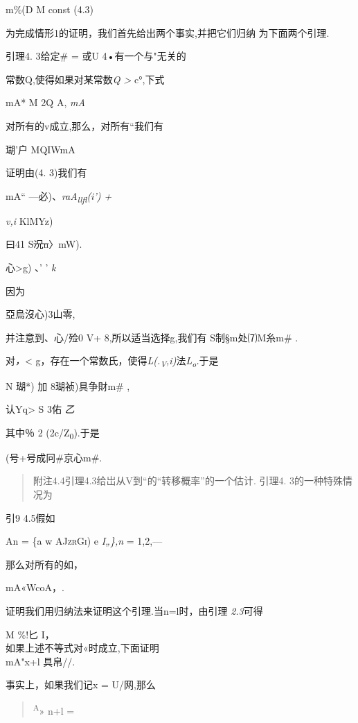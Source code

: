 m\%(D M const (4.3)

为完成情形1的证明，我们首先给出两个事实,并把它们归纳 为下面两个引理.

引理4. 3给定\# = 或U 4•有一个与"无关的

常数Q,使得如果对某常数\emph{Q \textgreater{}} c°,下式

mA* M 2Q \textbar{} A, \textbar{} \emph{mA}

对所有的v成立,那么，对所有``我们有

瑚'户 MQIWmA

证明由(4. 3)我们有

mA`` ---必)、\emph{raA\textsubscript{llfl}(i') +}

\emph{v,i} KlMYz)

曰41 S\sout{况n}〉mW).

心\textgreater{}g) 、' ' \emph{k}

因为

亞烏沒心)3山零,

并注意到、心\textbar{}/殓0 V+ 8,所以适当选择g,我们有 S制§m处⑺M糸m\# .

对\emph{，}\textless{}
g，存在一个常数氏，使得\emph{L(.\textsubscript{V},i)}法\emph{L\textsubscript{o}.}于是

N 瑚*) 加 8瑚祯)具争財m\# ,

认Yq\textgreater{} S 3佑 \emph{乙}

其中％ 2 (2c/Z\textsubscript{0}).于是

(号+号\textbar{}成冋\#京心\textbar{}m\#. \textbar{}

\begin{quote}
附注4.4引理4.3给岀从V到``的``转移概率''的一个估计. 引理4.
3的一种特殊情况为
\end{quote}

引9 4.5假如

An = \{a w \textsc{AJzrGi)} e \emph{I„\},n} = 1,2,---

那么对所有的如，

mA«Wco\textbar{}A，\textbar{}.

证明我们用归纳法来证明这个引理.当n=l时，由引理 \emph{2.3}可得

M \%!匕 I，\\
如果上述不等式对«时成立,下面证明\\
mA"x+l 具帛//.

事实上，如果我们记x = U/网,那么

\begin{quote}
\textsuperscript{A}» n+l =
\end{quote}

